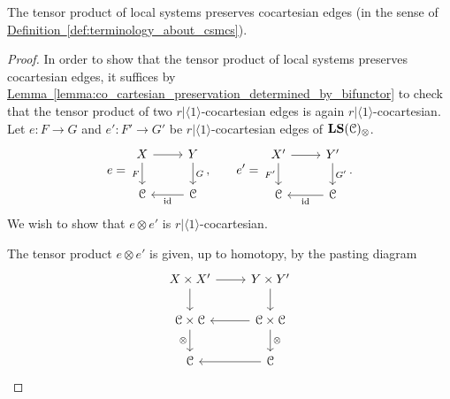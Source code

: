 \documentclass[main.tex]{subfiles}
\begin{document}
\begin{lemma}
  \label{lemma:tensor_product_of_local_systems_preserves_cocart_edges}
  The tensor product of local systems preserves cocartesian edges (in the sense of \hyperref[def:terminology_about_csmcs]{Definition~\ref*{def:terminology_about_csmcs}}).
\end{lemma}
\begin{proof}
  In order to show that the tensor product of local systems preserves cocartesian edges, it suffices by \hyperref[lemma:co_cartesian_preservation_determined_by_bifunctor]{Lemma~\ref*{lemma:co_cartesian_preservation_determined_by_bifunctor}} to check that the tensor product of two $r|\langle 1 \rangle$-cocartesian edges is again $r|\langle 1 \rangle$-cocartesian. Let $e\colon F \to G$ and $e'\colon F' \to G'$ be $r|\langle 1 \rangle$-cocartesian edges of $\mathbf{LS}(\mathcal{C})_{\otimes}$.
  \begin{equation*}
    e =
    \begin{tikzcd}
      X
      \arrow[r]
      \arrow[d, swap, "F"]
      & Y
      \arrow[d, "G"]
      \\
      \category{C}
      & \category{C}
      \arrow[l, "\id"]
    \end{tikzcd},\qquad e' =
    \begin{tikzcd}
      X'
      \arrow[r]
      \arrow[d, swap, "F'"]
      & Y'
      \arrow[d, "G'"]
      \\
      \category{C}
      & \category{C}
      \arrow[l, "\id"]
    \end{tikzcd}.
  \end{equation*}
  We wish to show that $e \otimes e'$ is $r|\langle 1 \rangle$-cocartesian.

  The tensor product $e \otimes e'$ is given, up to homotopy, by the pasting diagram
  \begin{equation*}
    \begin{tikzcd}
      X \times X'
      \arrow[r]
      \arrow[d]
      & Y \times Y'
      \arrow[d]
      \\
      \category{C} \times \category{C}
      \arrow[d, swap, "\otimes"]
      & \category{C} \times \category{C}
      \arrow[d, "\otimes"]
      \arrow[l]
      \\
      \category{C}
      & \category{C}
      \arrow[l]
    \end{tikzcd}
  \end{equation*}
  

\end{proof}
\end{document}

